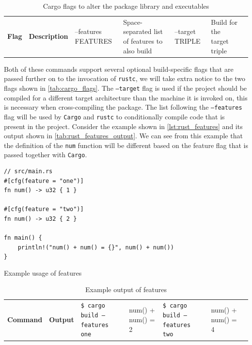 \begin{table}[ht]
\begin{center}
\begin{tabular}{r|l}
\textbf{Flag} & \textbf{Description}                                   &
\hline
--features FEATURES   & Space-separated list of features to also build &
--target TRIPLE       & Build for the target triple                    &
\hline
\end{tabular}
\caption{Cargo flags to alter the package library and executables}
\label{tab:cargo_flags}
\end{center}
\end{table}

Both of these commands support several optional build-specific flags that are passed further on to the invocation of \texttt{rustc}, we will take extra notice to the two flags shown in \autoref{tab:cargo_flags}.
The \texttt{--target} flag is used if the project should be compiled for a different target architecture than the machine it is invoked on, this is necessary when cross-compiling the package.
The list following the \texttt{--features} flag will be used by \texttt{Cargo} and \texttt{rustc} to conditionally compile code that is present in the project.
Consider the example shown in \autoref{lst:rust_features} and its output shown in \autoref{tab:rust_features_output}.
We can see from this example that the definition of the \texttt{num} function will be different based on the feature flag that is passed together with \texttt{Cargo}.

\begin{listing}[H]
\begin{verbatim}
// src/main.rs
#[cfg(feature = "one")]
fn num() -> u32 { 1 }

#[cfg(feature = "two")]
fn num() -> u32 { 2 }

fn main() {
    println!("num() + num() = {}", num() + num())
}
\end{verbatim}
\caption{Example usage of features}
\label{lst:rust_features}
\end{listing}

\begin{table}[ht]
\begin{center}
\begin{tabular}{r|l}
\textbf{Command} & \textbf{Output}                          &
\hline
\texttt{\$ cargo build --features one}  & num() + num() = 2 &
\texttt{\$ cargo build --features two}  & num() + num() = 4 &
\hline
\end{tabular}
\caption{Example output of features}
\label{tab:rust_features_output}
\end{center}
\end{table}
